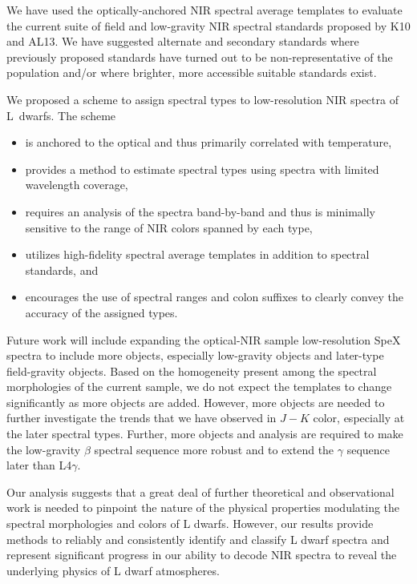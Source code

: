 \documentclass[12pt]{aastex6}
\begin{document}
We have used the optically-anchored NIR spectral average templates to evaluate the current suite of field and low-gravity NIR spectral standards proposed by K10 and AL13.
We have suggested alternate and secondary standards where previously proposed standards have turned out to be non-representative of the population and/or where brighter, more accessible suitable standards exist.

We proposed a scheme to assign spectral types to low-resolution NIR spectra of L~dwarfs.
The scheme
\begin{itemize}
\item is anchored to the optical and thus primarily correlated with temperature,
\item provides a method to estimate spectral types using spectra with limited wavelength coverage,
\item requires an analysis of the spectra band-by-band and thus is minimally sensitive to the range of NIR colors spanned by each type,
\item utilizes high-fidelity spectral average templates in addition to spectral standards, and
\item encourages the use of spectral ranges and colon suffixes to clearly convey the accuracy of the assigned types.
\end{itemize}

Future work will include expanding the optical-NIR sample low-resolution SpeX spectra to include more objects, especially low-gravity objects and later-type field-gravity objects.
Based on the homogeneity present among the spectral morphologies of the current sample, we do not expect the templates to change significantly as more objects are added.
However, more objects are needed to further investigate the trends that we have observed in $J-K$ color, especially at the later spectral types.
Further, more objects and analysis are required to make the low-gravity $\beta$ spectral sequence more robust and to extend the $\gamma$ sequence later than L4$\gamma$.

Our analysis suggests that a great deal of further theoretical and observational work is needed to pinpoint the nature of the physical properties modulating the spectral morphologies and colors of L dwarfs.
However, our results provide methods to reliably and consistently identify and classify L dwarf spectra and represent significant progress in our ability to decode NIR spectra to reveal the underlying physics of L dwarf atmospheres.
\end{document}
